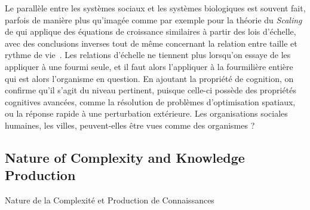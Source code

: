 Le parallèle entre les systèmes sociaux et les systèmes biologiques est souvent fait, parfois de manière plus qu'imagée comme par exemple pour la théorie du \emph{Scaling} de  qui applique des équations de croissance similaires à partir des lois d'échelle, avec des conclusions inverses tout de même concernant la relation entre taille et rythme de vie~\cite{bettencourt2007growth}. Les relations d'échelle ne tiennent plus lorsqu'on essaye de les appliquer à une fourmi seule, et il faut alors l'appliquer à la fourmilière entière qui est alors l'organisme en question. En ajoutant la propriété de cognition, on confirme qu'il s'agit du niveau pertinent, puisque celle-ci possède des propriétés cognitives avancées, comme la résolution de problèmes d'optimisation spatiaux, ou la réponse rapide à une perturbation extérieure. Les organisations sociales humaines, les villes, peuvent-elles être vues comme des organismes ? %










\subsection{Nature of Complexity and Knowledge Production}{Nature de la Complexité et Production de Connaissances}






